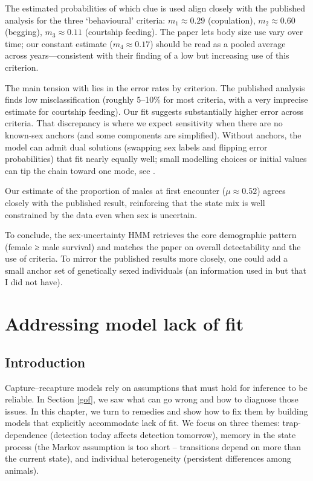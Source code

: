 \documentclass[
  12pt,
]{krantz}
\begin{document}
The estimated probabilities of which clue is used align closely with the published analysis for the three `behavioural' criteria: \(m_1 \approx 0.29\) (copulation), \(m_2 \approx 0.60\) (begging), \(m_3 \approx 0.11\) (courtship feeding). The paper lets body size use vary over time; our constant estimate (\(m_4 \approx 0.17\)) should be read as a pooled average across years---consistent with their finding of a low but increasing use of this criterion.

The main tension with lies in the error rates by criterion. The published analysis finds low misclassification (roughly 5--10\% for most criteria, with a very imprecise estimate for courtship feeding). Our fit suggests substantially higher error across criteria. That discrepancy is where we expect sensitivity when there are no known‐sex anchors (and some components are simplified). Without anchors, the model can admit dual solutions (swapping sex labels and flipping error probabilities) that fit nearly equally well; small modelling choices or initial values can tip the chain toward one mode, see \citet{pradel2008sex}.

Our estimate of the proportion of males at first encounter (\(\mu \approx 0.52\)) agrees closely with the published result, reinforcing that the state mix is well constrained by the data even when sex is uncertain.

To conclude, the sex‐uncertainty HMM retrieves the core demographic pattern (female ≥ male survival) and matches the paper on overall detectability and the use of criteria. To mirror the published results more closely, one could add a small anchor set of genetically sexed individuals (an information used in \citet{pradel2008sex} but that I did not have).

\chapter{Addressing model lack of fit}\label{lackoffit}

\section{Introduction}\label{introduction-9}

Capture--recapture models rely on assumptions that must hold for inference to be reliable. In Section \ref{gof}, we saw what can go wrong and how to diagnose those issues. In this chapter, we turn to remedies and show how to fix them by building models that explicitly accommodate lack of fit. We focus on three themes: trap-dependence (detection today affects detection tomorrow), memory in the state process (the Markov assumption is too short -- transitions depend on more than the current state), and individual heterogeneity (persistent differences among animals).
\end{document}
